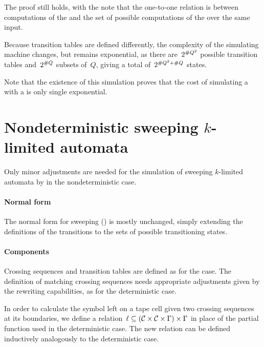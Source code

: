 The proof still holds, with the note that the one-to-one relation is between computations of the \ODFA and the set of possible computations of the \TNFA over the same input.

Because transition tables are defined differently, the complexity of the simulating machine changes, but remains exponential, as there are~$2^{\# Q^2}$ possible transition tables and~$2^{\# Q}$ subsets of~$Q$, giving a total of~$2^{\# Q^2+\# Q}$ states.

Note that the existence of this simulation proves that the cost of simulating a \TNFA with a \ODFA is only single exponential.



\section[Nondeterministic sweeping \texorpdfstring{\kLAs}{k-LAs}]{Nondeterministic sweeping $k$-limited automata}\label{sec:nondet-sweeping}
Only minor adjustments are needed for the simulation of sweeping $k$-limited automata by \ONFAs in the nondeterministic case.


\paragraph{Normal form} The normal form for sweeping \kLAs () is mostly unchanged, simply extending the definitions of the transitions to the sets of possible transitioning states.

\paragraph{Components} Crossing sequences and transition tables are defined as for the \TNFA case. The definition of matching crossing sequences needs appropriate adjustments given by the rewriting capabilities, as for the deterministic case.

In order to calculate the symbol left on a tape cell given two crossing sequences at its boundaries, we define a relation~$\ell\subseteq(\mathcal C\times\mathcal C\times\Gamma)\times\Gamma$ in place of the partial function used in the deterministic case.
The new relation can be defined inductively analogously to the deterministic case.

